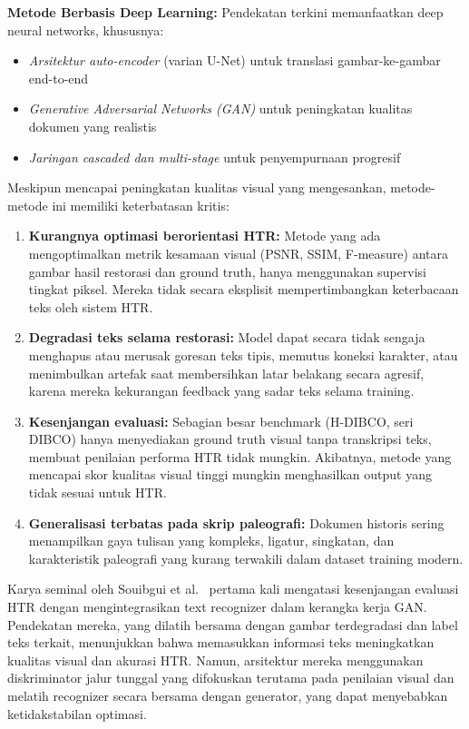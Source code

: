 \documentclass[journal]{IEEEtran}
\begin{document}
\textbf{Metode Berbasis Deep Learning:} Pendekatan terkini memanfaatkan deep neural networks, khususnya:
\begin{itemize}
    \item \textit{Arsitektur auto-encoder} (varian U-Net) untuk translasi gambar-ke-gambar end-to-end~\cite{tensmeyer2017document,calvo2018selectional}
    \item \textit{Generative Adversarial Networks (GAN)} untuk peningkatan kualitas dokumen yang realistis~\cite{souibgui2020degan,zhao2019document}
    \item \textit{Jaringan cascaded dan multi-stage} untuk penyempurnaan progresif~\cite{vo2018binarization}
\end{itemize}

Meskipun mencapai peningkatan kualitas visual yang mengesankan, metode-metode ini memiliki keterbatasan kritis:

\begin{enumerate}
    \item \textbf{Kurangnya optimasi berorientasi HTR:} Metode yang ada mengoptimalkan metrik kesamaan visual (PSNR, SSIM, F-measure) antara gambar hasil restorasi dan ground truth, hanya menggunakan supervisi tingkat piksel. Mereka tidak secara eksplisit mempertimbangkan keterbacaan teks oleh sistem HTR.
    
    \item \textbf{Degradasi teks selama restorasi:} Model dapat secara tidak sengaja menghapus atau merusak goresan teks tipis, memutus koneksi karakter, atau menimbulkan artefak saat membersihkan latar belakang secara agresif, karena mereka kekurangan feedback yang sadar teks selama training.
    
    \item \textbf{Kesenjangan evaluasi:} Sebagian besar benchmark (H-DIBCO, seri DIBCO) hanya menyediakan ground truth visual tanpa transkripsi teks, membuat penilaian performa HTR tidak mungkin. Akibatnya, metode yang mencapai skor kualitas visual tinggi mungkin menghasilkan output yang tidak sesuai untuk HTR.
    
    \item \textbf{Generalisasi terbatas pada skrip paleografi:} Dokumen historis sering menampilkan gaya tulisan yang kompleks, ligatur, singkatan, dan karakteristik paleografi yang kurang terwakili dalam dataset training modern.
\end{enumerate}

Karya seminal oleh Souibgui et al.~\cite{souibgui2021enhance} pertama kali mengatasi kesenjangan evaluasi HTR dengan mengintegrasikan text recognizer dalam kerangka kerja GAN. Pendekatan mereka, yang dilatih bersama dengan gambar terdegradasi dan label teks terkait, menunjukkan bahwa memasukkan informasi teks meningkatkan kualitas visual dan akurasi HTR. Namun, arsitektur mereka menggunakan diskriminator jalur tunggal yang difokuskan terutama pada penilaian visual dan melatih recognizer secara bersama dengan generator, yang dapat menyebabkan ketidakstabilan optimasi.
\end{document}
